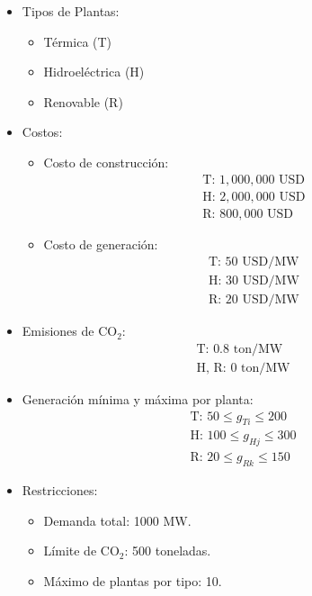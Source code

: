 \documentclass{article}
\begin{document}
\begin{itemize}
    \item Tipos de Plantas:
    \begin{itemize}
        \item Térmica (T)
        \item Hidroeléctrica (H)
        \item Renovable (R)
    \end{itemize}
    \item Costos:
    \begin{itemize}
        \item Costo de construcción: 
        \begin{align*}
            &\text{T: } 1,000,000 \text{ USD} \\
            &\text{H: } 2,000,000 \text{ USD} \\
            &\text{R: } 800,000 \text{ USD}
        \end{align*}
        \item Costo de generación:
        \begin{align*}
            &\text{T: } 50 \text{ USD/MW} \\
            &\text{H: } 30 \text{ USD/MW} \\
            &\text{R: } 20 \text{ USD/MW}
        \end{align*}
    \end{itemize}
    \item Emisiones de CO$_2$:
    \begin{align*}
        &\text{T: } 0.8 \text{ ton/MW} \\
        &\text{H, R: } 0 \text{ ton/MW}
    \end{align*}
    \item Generación mínima y máxima por planta:
    \begin{align*}
        &\text{T: } 50 \leq g_{Ti} \leq 200 \\
        &\text{H: } 100 \leq g_{Hj} \leq 300 \\
        &\text{R: } 20 \leq g_{Rk} \leq 150
    \end{align*}
    \item Restricciones:
    \begin{itemize}
        \item Demanda total: 1000 MW.
        \item Límite de CO$_2$: 500 toneladas.
        \item Máximo de plantas por tipo: 10.
    \end{itemize}
\end{itemize}
\end{document}
